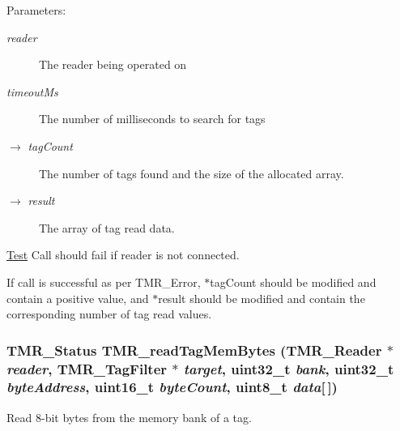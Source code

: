 \begin{Desc}
\item[Parameters:]
\begin{description}
\item[{\em reader}]The reader being operated on \item[{\em timeoutMs}]The number of milliseconds to search for tags \item[\mbox{$\rightarrow$} {\em tagCount}]The number of tags found and the size of the allocated array. \item[\mbox{$\rightarrow$} {\em result}]The array of tag read data.\end{description}
\end{Desc}
\begin{Desc}
\item[\hyperlink{test__test000008}{Test}]Call should fail if reader is not connected. 

If call is successful as per TMR\_\-Error, $\ast$tagCount should be modified and contain a positive value, and $\ast$result should be modified and contain the corresponding number of tag read values. \end{Desc}
\hypertarget{group__reader_g2a136073cc2a93bf39ad699d57f9809f}{
\subsubsection[{TMR\_\-readTagMemBytes}]{\setlength{\rightskip}{0pt plus 5cm}TMR\_\-Status TMR\_\-readTagMemBytes ({\bf TMR\_\-Reader} $\ast$ {\em reader}, \/  {\bf TMR\_\-TagFilter} $\ast$ {\em target}, \/  uint32\_\-t {\em bank}, \/  uint32\_\-t {\em byteAddress}, \/  uint16\_\-t {\em byteCount}, \/  uint8\_\-t {\em data}\mbox{[}$\,$\mbox{]})}}
\label{group__reader_g2a136073cc2a93bf39ad699d57f9809f}


Read 8-bit bytes from the memory bank of a tag.

